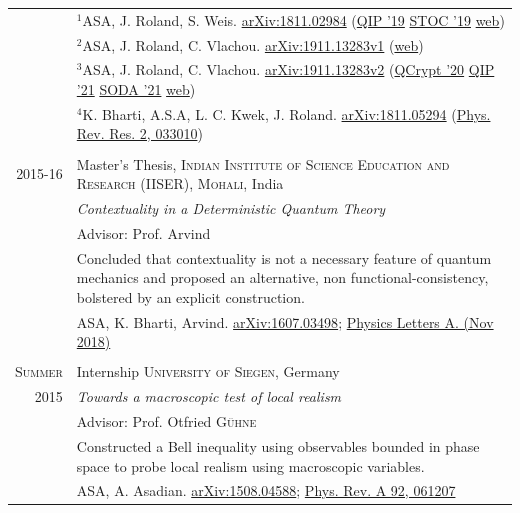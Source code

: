 \documentclass[a4paper,10pt]{article}
\begin{document}
\begin{longtable}{r|p{11cm}}
                    &\small{{\tiny $^1$}ASA, J. Roland, S. Weis. \href{https://arxiv.org/abs/1811.02984}{arXiv:1811.02984} (\href{https://www.youtube.com/watch?v=eNK6X7BlG5U&list=PLGdMsPGuoD25wLgnY7RBoTAxsnQEMsNA0&index=12}{QIP '19} \href{http://dx.doi.org/10.1145/3313276.3316306}{STOC '19} \href{https://atulsingharora.github.io/WCF}{web}) }\\
                    &\small{{\tiny $^2$}ASA, J. Roland, C. Vlachou. \href{https://arxiv.org/abs/1911.13283v1}{arXiv:1911.13283v1}} (\href{https://atulsingharora.github.io/WCF_2}{web})\\
                    &\small{{\tiny $^3$}ASA, J. Roland, C. Vlachou. \href{https://arxiv.org/abs/1911.13283v2}{arXiv:1911.13283v2} (\href{https://youtu.be/A2GRxspzWUg?t=801}{QCrypt '20} \href{https://youtu.be/nlZ5JhoE0D8}{QIP '21} \href{https://doi.org/10.1137/1.9781611976465.58}{SODA '21} \href{https://atulsingharora.github.io/WCF_2}{web}})\\
                    &\small{{\tiny $^4$}K. Bharti, A.S.A, L. C. Kwek, J. Roland. \href{https://arxiv.org/abs/1811.05294}{arXiv:1811.05294} (\href{https://link.aps.org/doi/10.1103/PhysRevResearch.2.033010}{Phys. Rev. Res. 2, 033010}) }\\
  \\

 \textsc{2015-16} & Master's Thesis, \textsc{Indian Institute of Science Education and Research (IISER), Mohali}, India \\
                  &\emph{Contextuality in a Deterministic Quantum Theory}\\
                  &\small Advisor: Prof. Arvind\\ 
                  &\footnotesize{Concluded that contextuality is not a necessary feature of quantum mechanics and proposed an alternative, non functional-consistency, bolstered by an explicit construction.}\\
                  &\small{ASA, K. Bharti, Arvind. \href{https://arxiv.org/abs/1607.03498}{arXiv:1607.03498}; \href{https://doi.org/10.1016/j.physleta.2018.11.049}{Physics Letters A. (Nov 2018)} }\\            
 \\

\textsc{Summer}   & Internship \textsc{University of Siegen}, Germany\\
2015                  & \emph{Towards a macroscopic test of local realism}\\
                      & \small{Advisor: Prof. Otfried \textsc{Gühne}}\\
                      & \footnotesize{Constructed a Bell inequality using observables bounded in phase space to probe local realism using macroscopic variables.} \\
                      & \small{ASA, A. Asadian. \href{https://arxiv.org/abs/1508.04588}{arXiv:1508.04588}; \href{http://dx.doi.org/10.1103/PhysRevA.92.062107}{Phys. Rev. A 92, 061207} }\\
                      

\end{longtable}
\end{document}

